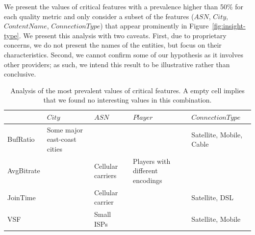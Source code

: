 


We present the values of critical features with a prevalence 
higher than 50\% for each quality metric and 
only consider a subset of the features ($ASN$, $City$, 
$ContentName$, $ConnectionType$) that appear 
prominently in  Figure~\ref{fig:insight-type}.  
We present this analysis with two caveats.  
First, due to proprietary concerns, we do not present 
the names of the entities, but focus on their characteristics.  
Second, we cannot confirm some of our hypothesis as it 
involves other  providers;  as such, we intend this result 
to be illustrative rather than conclusive. 

\begin{table}[t!]
\begin{tabular}{p{2.0cm}|p{3cm}|p{3cm}|p{3cm}|p{3cm}}
   &\textbf{$City$} & \textbf{$ASN$} & \textbf{$Player$} & \textbf{$ConnectionType$}\\ \hline \hline
BufRatio & Some major east-coast cities & & & Satellite, Mobile, Cable \\ \hline
AvgBitrate & & Cellular carriers & Players with different encodings & \\ \hline
JoinTime &  & Cellular carrier & & Satellite, DSL \\ \hline
VSF & & Small ISPs & & Satellite, Mobile \\
\end{tabular}
\caption{Analysis of the most prevalent values of critical features. 
A empty cell implies that we found no interesting values in this combination.}
\label{tab:insight-popular-values}
\end{table}

